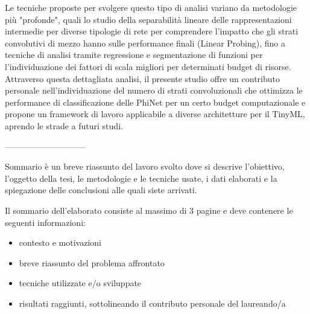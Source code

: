 
Le tecniche proposte per svolgere questo tipo di analisi variano da metodologie più "profonde", quali lo studio della separabilità lineare delle rappresentazioni intermedie per diverse tipologie di rete per comprendere l'impatto che gli strati convolutivi di mezzo hanno sulle performance finali (Linear Probing), fino a tecniche di analisi tramite regressione e segmentazione di funzioni per l'individuazione dei fattori di scala migliori per determinati budget di risorse. 
Attraverso questa dettagliata analisi, il presente studio offre un contributo personale nell'individuazione del numero di strati convoluzionali che ottimizza le performance di classificazione delle PhiNet per un certo budget computazionale e propone un framework di lavoro applicabile a diverse architetture per il TinyML, aprendo le strade a futuri studi.

-----------------------------

Sommario è un breve riassunto del lavoro svolto dove si descrive l'obiettivo, l'oggetto della tesi, le 
metodologie e le tecniche usate, i dati elaborati e la spiegazione delle conclusioni alle quali siete arrivati.  

Il sommario dell’elaborato consiste al massimo di 3 pagine e deve contenere le seguenti informazioni:
\begin{itemize}
  \item contesto e motivazioni 
  \item breve riassunto del problema affrontato
  \item tecniche utilizzate e/o sviluppate
  \item risultati raggiunti, sottolineando il contributo personale del laureando/a
\end{itemize}
